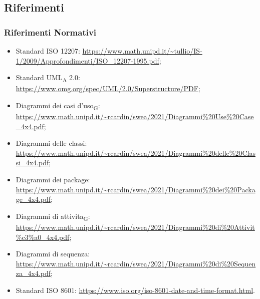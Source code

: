 \subsection{Riferimenti}
\label{ref}
    \subsubsection{Riferimenti Normativi}
        \begin{itemize}
            \item Standard ISO 12207: \url{https://www.math.unipd.it/~tullio/IS-1/2009/Approfondimenti/ISO_12207-1995.pdf};
            \item Standard UML\textsubscript{A} 2.0: \url{https://www.omg.org/spec/UML/2.0/Superstructure/PDF};
            \item Diagrammi dei casi d'uso\textsubscript{G}: \url{https://www.math.unipd.it/~rcardin/swea/2021/Diagrammi\%20Use\%20Case_4x4.pdf};
            \item Diagrammi delle classi: \url{https://www.math.unipd.it/~rcardin/swea/2021/Diagrammi\%20delle\%20Classi_4x4.pdf};
            \item Diagrammi dei package: \url{https://www.math.unipd.it/~rcardin/swea/2021/Diagrammi\%20dei\%20Package_4x4.pdf};
            \item Diagrammi di attivita\textsubscript{G}: \url{https://www.math.unipd.it/~rcardin/swea/2021/Diagrammi\%20di\%20Attivit\%c3\%a0_4x4.pdf};
            \item Diagrammi di sequenza: \url{https://www.math.unipd.it/~rcardin/swea/2021/Diagrammi\%20di\%20Sequenza_4x4.pdf};
            \item Standard ISO 8601: \url{https://www.iso.org/iso-8601-date-and-time-format.html}.
        \end{itemize}

